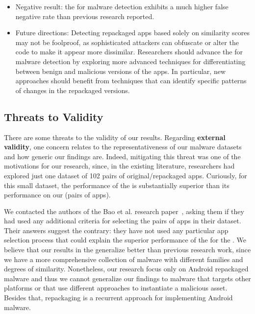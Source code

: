 \begin{itemize}
  \item Negative result: the \mas for malware detection exhibits a much higher false negative rate than previous research reported. 

  \item Future directions: Detecting repackaged apps based solely on similarity scores may not be foolproof, as sophisticated attackers can obfuscate or alter the code to make it appear more dissimilar. Researchers should advance the \mas for malware detection by exploring more advanced techniques for differentiating between benign and malicious versions of the apps. In particular, new approaches should benefit from techniques that can identify specific patterns of changes in the repackaged versions.
    
\end{itemize}  


\subsection{Threats to Validity}\label{sec:threats}


There are some threats to the validity of our results.
Regarding {\bf external validity}, one concern relates to the 
representativeness of our malware datasets and how generic our findings are.
Indeed, mitigating this threat was one of the motivations for our research,
since, in the existing literature, researchers had explored just
one dataset of 102 pairs of original/repackaged apps. Curiously,
for this small dataset, the performance of the
\mas is substantially superior
than its performance on our \cds (\apps pairs of
apps).

We contacted the authors of the Bao et al. research paper~\cite{DBLP:conf/wcre/BaoLL18}, asking them
if they had used any additional criteria for selecting the pairs of apps in their
dataset. Their answers suggest the contrary: they have not used
any particular app selection process that
could explain the superior performance of the \mas for the \sds. We believe that
our results in the \cds generalize better than previous research work,
since we have a more comprehensive collection of malware with different
families and degrees of similarity. Nonetheless, our
research focus only on Android repackaged malware and thus we cannot generalize
our findings to malware that targets other platforms or that use different approaches
to instantiate a malicious asset. Besides that, repackaging is a recurrent approach
for implementing Android malware.


